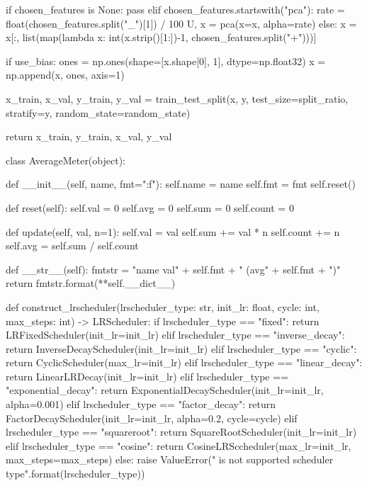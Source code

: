 \documentclass[14pt, a4paper]{article}
\theoremstyle{sltheorem}
\theoremstyle{soltheorem}
\begin{document}
\begin{python}
    if chosen_features is None:
        pass
    elif chosen_features.startswith("pca"):
        rate = float(chosen_features.split("_")[1]) / 100
        U, x = pca(x=x, alpha=rate)
    else:
        x = x[:, list(map(lambda x: int(x.strip()[1:])-1, chosen_features.split("+")))]
        
    if use_bias:
        ones = np.ones(shape=[x.shape[0], 1], dtype=np.float32)
        x = np.append(x, ones, axis=1)
     
    x_train, x_val, y_train, y_val = train_test_split(x, y, test_size=split_ratio, stratify=y, random_state=random_state)
    
    return x_train, y_train, x_val, y_val


class AverageMeter(object):

    def __init__(self, name, fmt=":f"):
        self.name = name
        self.fmt = fmt
        self.reset()

    def reset(self):
        self.val = 0
        self.avg = 0
        self.sum = 0
        self.count = 0

    def update(self, val, n=1):
        self.val = val
        self.sum += val * n
        self.count += n
        self.avg = self.sum / self.count

    def __str__(self):
        fmtstr = "{name} {val" + self.fmt + "} ({avg" + self.fmt + "})"
        return fmtstr.format(**self.__dict__)


def construct_lrscheduler(lrscheduler_type: str, init_lr: float, cycle: int, max_steps: int) -> LRScheduler:
    if lrscheduler_type == "fixed":
        return LRFixedScheduler(init_lr=init_lr)
    elif lrscheduler_type == "inverse_decay":
        return InverseDecayScheduler(init_lr=init_lr)
    elif lrscheduler_type == "cyclic":
        return CyclicScheduler(max_lr=init_lr)
    elif lrscheduler_type == "linear_decay":
        return LinearLRDecay(init_lr=init_lr)
    elif lrscheduler_type == "exponential_decay":
        return ExponentialDecayScheduler(init_lr=init_lr, alpha=0.001)
    elif lrscheduler_type == "factor_decay":
        return FactorDecayScheduler(init_lr=init_lr, alpha=0.2, cycle=cycle)
    elif lrscheduler_type == "squareroot":
        return SquareRootScheduler(init_lr=init_lr)
    elif lrscheduler_type == "cosine":
        return CosineLRSccheduler(max_lr=init_lr, max_steps=max_steps)
    else:
        raise ValueError("{} is not supported scheduler type".format(lrscheduler_type))


\end{python}
\end{document}
